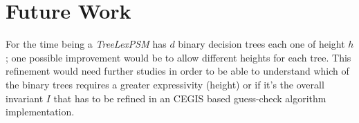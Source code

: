 \documentclass[a4paper,12pt, english]{article}
\begin{document}
\section{Future Work}

For the time being a \textit{TreeLexPSM} has $d$ binary decision trees each one of height $h$;
one possible improvement would be to allow different heights for each tree.
This refinement would need further studies in order to be able to understand which of the binary
trees requires a greater expressivity (height) or if it's the overall invariant $I$ that has to
be refined in an CEGIS based guess-check algorithm implementation.
\end{document}

